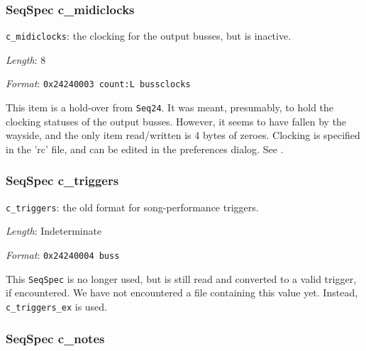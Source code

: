 \subsubsection{SeqSpec c\_midiclocks}
\label{subsubsec:midi_format_track_seqspec_midiclocks}


   \begin{description}
      \item \texttt{c\_midiclocks}: the clocking for the output busses,
         but is inactive.
      \item \textsl{Length}: 8
      \item \textsl{Format}: \texttt{0x24240003 count:L bussclocks}
   \end{description}

   This item is a hold-over from \texttt{Seq24}.  It was meant, presumably, to
   hold the clocking statuses of the output busses.  However, it seems to have
   fallen by the wayside, and the only item read/written is 4 bytes of zeroes.
   Clocking is specified in the 'rc' file, and can be edited in the preferences
   dialog.
   See .

\subsubsection{SeqSpec c\_triggers}
\label{subsubsec:midi_format_track_seqspec_triggers}


   \begin{description}
      \item \texttt{c\_triggers}:
         the old format for song-performance triggers.
      \item \textsl{Length}: Indeterminate
      \item \textsl{Format}: \texttt{0x24240004 buss}
   \end{description}

   This \texttt{SeqSpec} is no longer used, but is still read and
   converted to a valid trigger, if encountered.
   We have not encountered a file containing this value yet.
   Instead, \texttt{c\_triggers\_ex} is used.

\subsubsection{SeqSpec c\_notes}
\label{subsubsec:midi_format_track_seqspec_notes}

